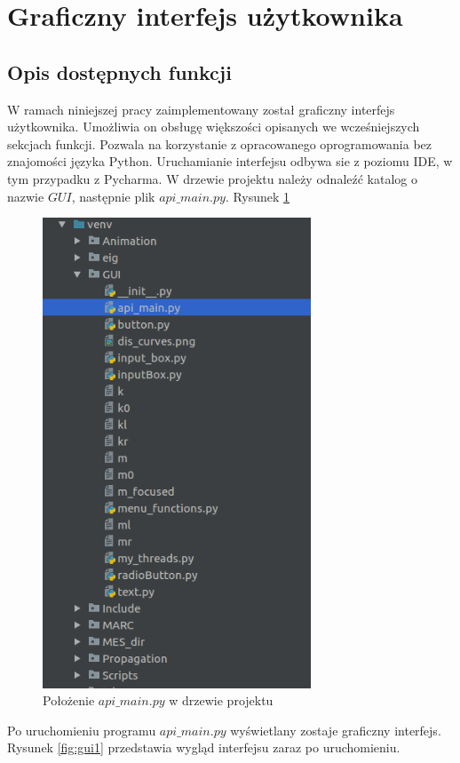 \section{Graficzny interfejs użytkownika}

\subsection{Opis dostępnych funkcji}
W ramach niniejszej pracy zaimplementowany został graficzny interfejs użytkownika. Umożliwia on obsługę większości opisanych we wcześniejszych sekcjach funkcji. Pozwala na korzystanie z opracowanego oprogramowania bez znajomości języka Python. Uruchamianie interfejsu odbywa sie z poziomu IDE, w tym przypadku z Pycharma. W drzewie projektu należy odnaleźć katalog o nazwie $GUI$, następnie plik $api\_main.py$. Rysunek \ref{fig:gui_tu_jest}

\begin{figure}[h]
\centering
\includegraphics[width=8cm]{Zdjecia/5/kasia/gui_drzewo}
\caption{Położenie $api\_main.py$ w drzewie projektu}
\label{fig:gui_tu_jest}
\end{figure}

Po uruchomieniu programu $api\_main.py$ wyświetlany zostaje graficzny interfejs. Rysunek \ref{fig:gui1} przedstawia wygląd interfejsu zaraz po uruchomieniu.

